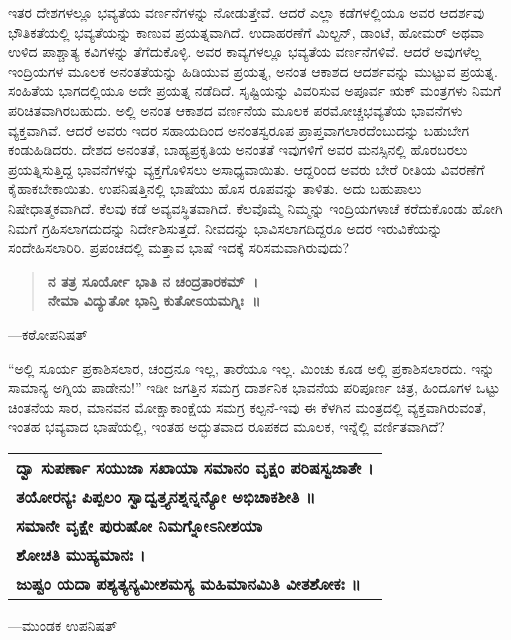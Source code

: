 ಇತರ ದೇಶಗಳಲ್ಲೂ ಭವ್ಯತೆಯ ವರ್ಣನೆಗಳನ್ನು ನೋಡುತ್ತೇವೆ. ಆದರೆ ಎಲ್ಲಾ ಕಡೆಗಳಲ್ಲಿಯೂ ಅವರ ಆದರ್ಶವು ಭೌತಿಕತೆಯಲ್ಲಿ ಭವ್ಯತೆಯನ್ನು ಕಾಣುವ ಪ್ರಯತ್ನವಾಗಿದೆ. ಉದಾಹರಣೆಗೆ ಮಿಲ್ಟನ್​, ಡಾಂಟೆ, ಹೋಮರ್​ ಅಥವಾ ಉಳಿದ ಪಾಶ್ಚಾತ್ಯ ಕವಿಗಳನ್ನು ತೆಗೆದುಕೊಳ್ಳಿ. ಅವರ ಕಾವ್ಯಗಳಲ್ಲೂ ಭವ್ಯತೆಯ ವರ್ಣನೆಗಳಿವೆ. ಆದರೆ ಅವುಗಳೆಲ್ಲ ಇಂದ್ರಿಯಗಳ ಮೂಲಕ ಅನಂತತೆಯನ್ನು ಹಿಡಿಯುವ ಪ್ರಯತ್ನ, ಅನಂತ ಆಕಾಶದ ಆದರ್ಶವನ್ನು ಮುಟ್ಟುವ ಪ್ರಯತ್ನ. ಸಂಹಿತೆಯ ಭಾಗದಲ್ಲಿಯೂ ಅದೇ ಪ್ರಯತ್ನ ನಡೆದಿದೆ. ಸೃಷ್ಟಿಯನ್ನು ವಿವರಿಸುವ ಅಪೂರ್ವ ಋಕ್​ ಮಂತ್ರಗಳು ನಿಮಗೆ ಪರಿಚಿತವಾಗಿರಬಹುದು. ಅಲ್ಲಿ ಅನಂತ ಆಕಾಶದ ವರ್ಣನೆಯ ಮೂಲಕ ಪರಮೋಚ್ಚ\break ಭವ್ಯತೆಯ ಭಾವನೆಗಳು ವ್ಯಕ್ತವಾಗಿವೆ. ಆದರೆ ಅವರು ಇದರ ಸಹಾಯದಿಂದ ಅನಂತಸ್ವರೂಪ ಪ್ರಾಪ್ತವಾಗಲಾರದೆಂಬುದನ್ನು ಬಹುಬೇಗ ಕಂಡುಹಿಡಿದರು. ದೇಶದ ಅನಂತತೆ, ಬಾಹ್ಯಪ್ರಕೃತಿಯ ಅನಂತತೆ ಇವುಗಳಿಗೆ ಅವರ ಮನಸ್ಸಿ\-ನಲ್ಲಿ ಹೊರಬರಲು ಪ್ರಯತ್ನಿಸುತ್ತಿದ್ದ ಭಾವನೆಗಳನ್ನು ವ್ಯಕ್ತಗೊಳಿಸಲು ಅಸಾಧ್ಯವಾಯಿತು. ಆದ್ದರಿಂದ ಅವರು ಬೇರೆ ರೀತಿಯ ವಿವರಣೆಗೆ ಕೈಹಾಕಬೇಕಾಯಿತು. ಉಪನಿಷತ್ತಿನಲ್ಲಿ ಭಾಷೆಯು ಹೊಸ ರೂಪವನ್ನು ತಾಳಿತು. ಅದು ಬಹುಪಾಲು ನಿಷೇಧಾತ್ಮಕವಾಗಿದೆ. ಕೆಲವು ಕಡೆ ಅವ್ಯವಸ್ಥಿತವಾಗಿದೆ. ಕೆಲವೊಮ್ಮೆ ನಿಮ್ಮನ್ನು ಇಂದ್ರಿಯಗಳಾಚೆ ಕರೆದುಕೊಂಡು ಹೋಗಿ ನಿಮಗೆ ಗ್ರಹಿಸಲಾಗದುದನ್ನು ನಿರ್ದೇಶಿಸುತ್ತದೆ. ನೀವದನ್ನು ಭಾವಿಸಲಾಗದಿದ್ದರೂ ಅದರ ಇರುವಿಕೆಯನ್ನು ಸಂದೇಹಿಸಲಾರಿರಿ. ಪ್ರಪಂಚದಲ್ಲಿ ಮತ್ತಾವ ಭಾಷೆ ಇದಕ್ಕೆ ಸರಿಸಮವಾಗಿರುವುದು?

\begin{verse}
\textbf{ನ ತತ್ರ ಸೂರ್ಯೋ ಭಾತಿ ನ ಚಂದ್ರತಾರಕಮ್​~।}\\\textbf{ನೇಮಾ ವಿದ್ಯುತೋ ಭಾನ್ತಿ ಕುತೋಽಯಮಗ್ನಿಃ~॥}
\end{verse}

\hfill —ಕಠೋಪನಿಷತ್​

\vskip 5pt

“ಅಲ್ಲಿ ಸೂರ್ಯ ಪ್ರಕಾಶಿಸಲಾರ, ಚಂದ್ರನೂ ಇಲ್ಲ, ತಾರೆಯೂ ಇಲ್ಲ. ಮಿಂಚು ಕೂಡ ಅಲ್ಲಿ ಪ್ರಕಾಶಿಸಲಾರದು. ಇನ್ನು ಸಾಮಾನ್ಯ ಅಗ್ನಿಯ ಪಾಡೇನು!” ಇಡೀ ಜಗತ್ತಿನ ಸಮಗ್ರ ದಾರ್ಶನಿಕ ಭಾವನೆಯ ಪರಿಪೂರ್ಣ ಚಿತ್ರ, ಹಿಂದೂಗಳ ಒಟ್ಟು ಚಿಂತನೆಯ ಸಾರ, ಮಾನವನ ಮೋಕ್ಷಾಕಾಂಕ್ಷೆಯ ಸಮಗ್ರ ಕಲ್ಪನೆ-ಇವು ಈ ಕೆಳಗಿನ ಮಂತ್ರದಲ್ಲಿ ವ್ಯಕ್ತವಾಗಿರುವಂತೆ, ಇಂತಹ ಭವ್ಯವಾದ ಭಾಷೆಯಲ್ಲಿ, ಇಂತಹ ಅದ್ಭುತವಾದ ರೂಪಕದ ಮೂಲಕ, ಇನ್ನೆಲ್ಲಿ ವರ್ಣಿತವಾಗಿದೆ?

\begin{longtable}{@{\hspace{-18pt}}l@{}}
\textbf{ದ್ವಾ ಸುಪರ್ಣಾ ಸಯುಜಾ ಸಖಾಯಾ ಸಮಾನಂ ವೃಕ್ಷಂ ಪರಿಷಸ್ವಜಾತೇ ।} \\
\textbf{ತಯೋರನ್ಯಃ ಪಿಪ್ಪಲಂ ಸ್ವಾದ್ವತ್ತ್ಯನಶ್ನನ್ನನ್ಯೋ ಅಭಿಚಾಕಶೀತಿ ॥} \\
\textbf{ಸಮಾನೇ ವೃಕ್ಷೇ ಪುರುಷೋ ನಿಮಗ್ನೋಽನೀಶಯಾ} \\
\textbf{ಶೋಚತಿ ಮುಹ್ಯಮಾನಃ ।} \\
\textbf{ಜುಷ್ಟಂ ಯದಾ ಪಶ್ಯತ್ಯನ್ಯಮೀಶಮಸ್ಯ ಮಹಿಮಾನಮಿತಿ ವೀತಶೋಕಃ ॥} \\
\end{longtable}

\hfill —ಮುಂಡಕ ಉಪನಿಷತ್​

